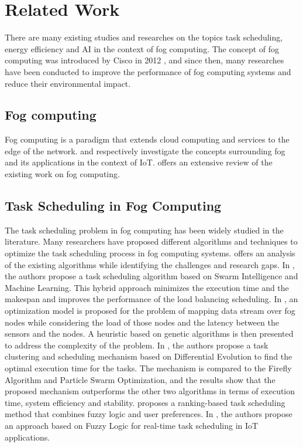 \chapter*{Related Work}
\label{chap:relatedwork}

There are many existing studies and researches on the topics task scheduling, energy efficiency and AI in the context
of fog computing. The concept of fog computing was introduced by Cisco in 2012 \cite{bonomi-et-al-2012}, and since
then, many researches have been conducted to improve the performance of fog computing systems and reduce their
environmental impact.

\section*{Fog computing}

Fog computing is a paradigm that extends cloud computing and services to the edge of the network.
\cite{rana-abubacker-2023} and \cite{abubacker-et-al-2023} respectively investigate the concepts surrounding fog
and its applications in the context of IoT. \cite{al-musawi-et-al-2023} offers an extensive review of the existing
work on fog computing.

\section*{Task Scheduling in Fog Computing}

The task scheduling problem in fog computing has been widely studied in the literature. Many researchers have proposed
different algorithms and techniques to optimize the task scheduling process in fog computing systems.
\cite{misirli-casalicchio-2024} offers an analysis of the existing algorithms while identifying the challenges and
research gaps. In \cite{rjoub-bentahar-2017}, the authors propose a task scheduling algorithm based on Swarm
Intelligence and Machine Learning. This hybrid approach minimizes the execution time and the makespan and improves the
performance of the load balancing scheduling. In \cite{canali-lancellotti-2019}, an optimization model is proposed for
the problem of mapping data stream over fog nodes while considering the load of those nodes and the latency between the
sensors and the nodes. A heuristic based on genetic algorithms is then presented to address the complexity of the
problem. In \cite{yousif-et-al-2024}, the authors propose a task clustering and scheduling mechanism based on
Differential Evolution to find the optimal execution time for the tasks. The mechanism is compared to the Firefly
Algorithm and Particle Swarm Optimization, and the results show that the proposed mechanism outperforms the other two
algorithms in terms of execution time, system efficiency and stability. \cite{benblidia-et-al-2019} proposes a
ranking-based task scheduling method that combines fuzzy logic and user preferences. In \cite{ali-et-al-2021}, the
authors propose an approach based on Fuzzy Logic for real-time task scheduling in IoT applications.

